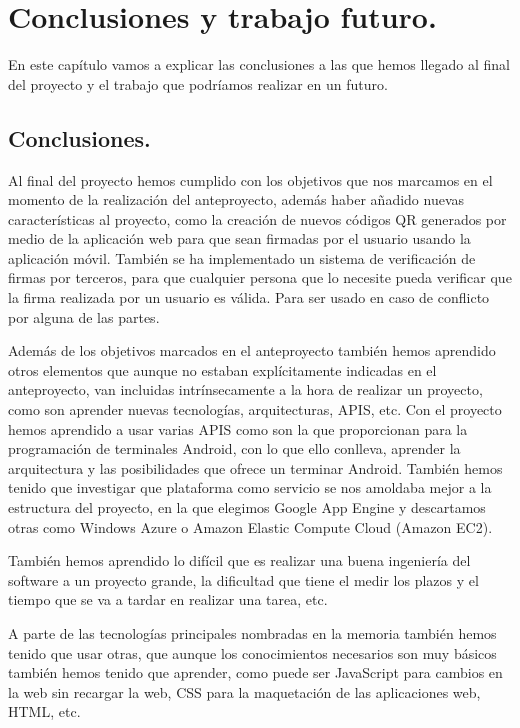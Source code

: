 \chapter{Conclusiones y trabajo futuro.}\label{cap:conclusionesYTrabajoFuturo}

En este capítulo vamos a explicar las conclusiones a las que hemos llegado al final del proyecto y el trabajo que podríamos realizar en un futuro.

\section{Conclusiones.}

Al final del proyecto hemos cumplido con los objetivos que nos marcamos en el momento de la realización del anteproyecto, además haber añadido nuevas características al proyecto, como la creación de nuevos códigos QR generados por medio de la aplicación web para que sean firmadas por el usuario usando la aplicación móvil. También se ha implementado un sistema de verificación de firmas por terceros, para que cualquier persona que lo necesite pueda verificar que la firma realizada por un usuario es válida. Para ser usado en caso de conflicto por alguna de las partes.

Además de los objetivos marcados en el anteproyecto también hemos aprendido otros elementos que aunque no estaban explícitamente indicadas en el anteproyecto, van incluidas intrínsecamente a la hora de realizar un proyecto, como son aprender nuevas tecnologías, arquitecturas, APIS, etc. Con el proyecto hemos aprendido a usar varias APIS como son la que proporcionan para la programación de terminales Android, con lo que ello conlleva, aprender la arquitectura y las posibilidades que ofrece un terminar Android. También hemos tenido que investigar que plataforma como servicio se nos amoldaba mejor a la estructura del proyecto, en la que elegimos Google App Engine y descartamos otras como Windows Azure o Amazon Elastic Compute Cloud (Amazon EC2).

También hemos aprendido lo difícil que es realizar una buena ingeniería del software a un proyecto grande, la dificultad que tiene el medir los plazos y el tiempo que se va a tardar en realizar una tarea, etc.

A parte de las tecnologías principales nombradas en la memoria también hemos tenido que usar otras, que aunque los conocimientos necesarios son muy básicos también hemos tenido que aprender, como puede ser JavaScript para cambios en la web sin recargar la web, CSS para la maquetación de las aplicaciones web, HTML, etc.

